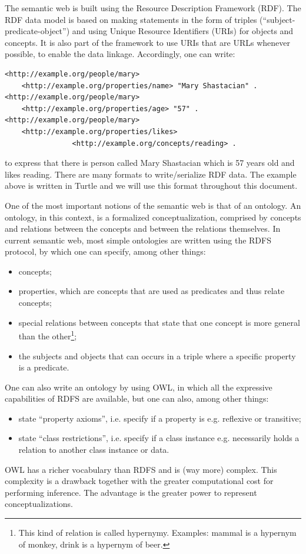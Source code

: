 \documentclass[12pt,fleqn]{article}
\begin{document}
The semantic web is built using the Resource Description Framework (RDF).
The RDF data model is based on making statements in the form of triples
(``subject-predicate-object'') and using Unique Resource Identifiers (URIs) for
objects and concepts.
It is also part of the framework to use URIs that are URLs whenever possible,
to enable the data linkage.
Accordingly, one can write:
\begin{Verbatim}[fontsize=\footnotesize]
<http://example.org/people/mary>
	<http://example.org/properties/name> "Mary Shastacian" .
<http://example.org/people/mary>
	<http://example.org/properties/age> "57" .
<http://example.org/people/mary> 
	<http://example.org/properties/likes> 
                <http://example.org/concepts/reading> .
\end{Verbatim}
\noindent to express that there is person called Mary Shastacian which is 57 years old and likes reading.
There are many formats to write/serialize RDF data.
The example above is written in Turtle and we will use this format throughout this document.

One of the most important notions of the semantic web is that of an ontology.
An ontology, in this context, is a formalized conceptualization, comprised by
concepts and relations between the concepts and between the relations themselves.
In current semantic web, most simple ontologies are written using the RDFS protocol,
by which one can specify, among other things:
\begin{itemize}
	\item concepts;
	\item properties, which are concepts that are used as predicates and thus relate concepts;
	\item special relations between concepts that state that one concept is more general than the other\footnote{This
		kind of relation is called hypernymy. Examples: mammal is a hypernym of monkey, drink is a hypernym of beer.};
	\item the subjects and objects that can occurs in a triple where a specific property is a predicate.
\end{itemize}

One can also write an ontology by using OWL,
in which all the expressive capabilities of RDFS are
available, but one can also, among other things:
\begin{itemize}
	\item state ``property axioms'', i.e. specify if a property is e.g. reflexive or transitive;
	\item state ``class restrictions'', i.e. specify if a class instance e.g. necessarily holds a relation to another class instance or data.
\end{itemize}
OWL has a richer vocabulary than RDFS and is (way more) complex.
This complexity is a drawback together with the greater computational cost
for performing inference.
The advantage is the greater power to represent conceptualizations.
\end{document}
